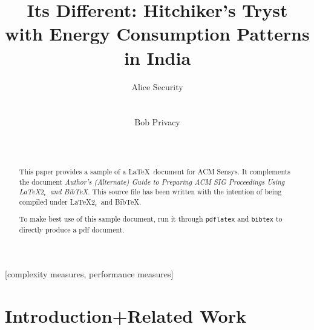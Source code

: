 \documentclass[10pt]{sensys-proc}
\author{
%
\alignauthor Alice Security \\
        \affaddr{Department of Computer Science}\\
        \affaddr{University of Southern California}\\
       \email{alice@example.edu}
\alignauthor Bob Privacy \\
    \affaddr{Networked Embedded Systems Group}\\
    \affaddr{Swedish Institute of Computer Science}\\
    \email{bob@example.se}
}
\title{Its Different: Hitchiker’s Tryst with Energy Consumption Patterns in India}
\begin{document}
\maketitle

\begin{abstract}
This paper provides a sample of a \LaTeX\ document for ACM Sensys. 
It complements the document \textit{Author's (Alternate) Guide to
Preparing ACM SIG Proceedings Using \LaTeX$2_\epsilon$\ and Bib\TeX}.
This source file has been written with the intention of being
compiled under \LaTeX$2_\epsilon$\ and BibTeX.

To make best use of this sample document, run it through \texttt{pdflatex}
and \texttt{bibtex} to directly produce a pdf document.
\end{abstract}

[complexity measures, performance measures]



\section{Introduction+Related Work}
  \label{sec:intro}
\end{document}
